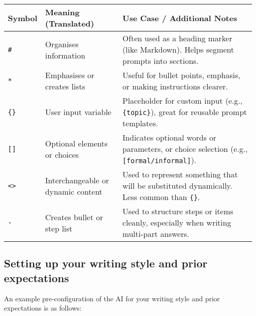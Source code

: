 \documentclass[
  10t,
]{article}
\begin{document}
\begin{longtable}[]{@{}
  >{\raggedright\arraybackslash}p{}
  >{\raggedright\arraybackslash}p{}
  >{\raggedright\arraybackslash}p{}@{}}
\toprule\noalign{}
\begin{minipage}[b]{\linewidth}\raggedright
Symbol
\end{minipage} & \begin{minipage}[b]{\linewidth}\raggedright
Meaning (Translated)
\end{minipage} & \begin{minipage}[b]{\linewidth}\raggedright
Use Case / Additional Notes
\end{minipage} \\
\midrule\noalign{}
\endhead
\bottomrule\noalign{}
\endlastfoot
\texttt{\#} & Organises information & Often used as a heading marker
(like Markdown). Helps segment prompts into sections. \\
\texttt{*} & Emphasises or creates lists & Useful for bullet points,
emphasis, or making instructions clearer. \\
\texttt{\{\}} & User input variable & Placeholder for custom input
(e.g., \texttt{\{topic\}}), great for reusable prompt templates. \\
\texttt{{[}{]}} & Optional elements or choices & Indicates optional
words or parameters, or choice selection (e.g.,
\texttt{{[}formal/informal{]}}). \\
\texttt{\textless{}\textgreater{}} & Interchangeable or dynamic content
& Used to represent something that will be substituted dynamically. Less
common than \texttt{\{\}}. \\
\texttt{-} & Creates bullet or step list & Used to structure steps or
items cleanly, especially when writing multi-part answers. \\
\end{longtable}

\subsection{Setting up your writing style and prior
expectations}\label{setting-up-your-writing-style-and-prior-expectations}

An example pre-configuration of the AI for your writing style and prior
expectations is as follows:
\end{document}
